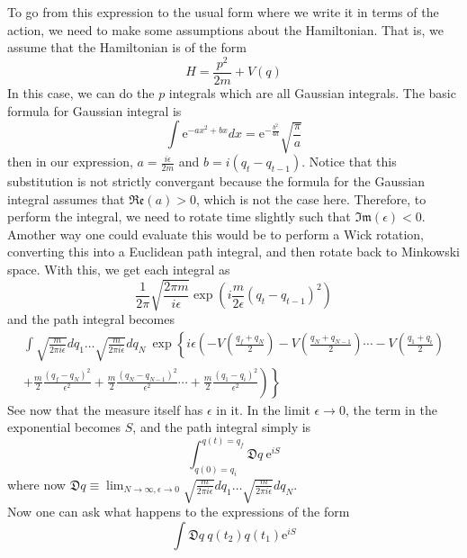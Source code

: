 \documentclass[11pt]{article}
\newcommand{\e}{\mathrm{e}}
\newcommand{\D}{\mathfrak{D}}
\numberwithin{equation}{section}
\begin{document}
To go from this expression to the usual form where we write it in terms of the action, we need to make some assumptions about the Hamiltonian. That is, we assume that the Hamiltonian is of the form 
\begin{equation*}
    H = \frac{p^2}{2m} + V(q)
\end{equation*}
In this case, we can do the \(p\) integrals which are all Gaussian integrals. The basic formula for Gaussian integral is 
\begin{equation*}
    \int \e^{-ax^2 + bx}dx = \e^{-\frac{b^2}{4a}}\sqrt{\frac{\pi}{a}}
\end{equation*}
then in our expression, \(a =\displaystyle \frac{i\epsilon}{2m}\) and \(b = i(q_t - q_{t-1})\). Notice that this substitution is not strictly convergant because the formula for the Gaussian integral assumes that \(\mathfrak{Re}(a) >0 \), which is not the case here. Therefore, to perform the integral, we need to rotate time slightly such that \(\mathfrak{Im}(\epsilon)<0 \). Amother way one could evaluate this would be to perform a Wick rotation, converting this into a Euclidean path integral, and then rotate back to Minkowski space. With this, we get each integral as 
\begin{equation*}
    \frac{1}{2\pi} \sqrt{\frac{2\pi m}{i\epsilon}}\exp\left( i\frac{m}{2\epsilon} (q_t - q_{t-1})^2 \right)
\end{equation*}
and the path integral becomes 
\begin{align*}
    \int \sqrt{\frac{m}{2\pi i\epsilon}} dq_1 \ldots\sqrt{\frac{m}{2\pi i\epsilon}} dq_N ~\exp\left\{i\epsilon \left( -V\left(\frac{q_f + q_N}{2}\right) - V\left(\frac{q_N + q_{N-1}}{2}\right) \cdots -V\left(\frac{q_1 + q_{i}}{2}\right) \right.\right. \\
    \left.\left.+ \frac{m}{2}\frac{(q_f - q_N)^2}{\epsilon^2} + \frac{m}{2} \frac{(q_N - q_{N-1})^2}{\epsilon^2}\cdots  +  \frac{m}{2} \frac{(q_1 - q_{i})^2}{\epsilon^2} \right) \right\}
\end{align*}
See now that the measure itself has \(\epsilon\) in it.  In the limit \(\epsilon \to 0\), the term in the exponential becomes \(S\), and the path integral simply is 
\begin{equation*}
    \int_{q(0) = q_i}^{q(t) = q_f} \mathfrak{D}q ~\e^{iS}
\end{equation*}
where now \(\displaystyle \mathfrak{D}q \equiv \lim_{N\to\infty, \epsilon\to 0} \sqrt{\frac{m}{2\pi i\epsilon}} dq_1 \ldots\sqrt{\frac{m}{2\pi i\epsilon}} dq_N \).\\

Now one can ask what happens to the expressions of the form 
\begin{equation*}
    \int \D q ~q(t_2)q(t_1) \e^{iS}
\end{equation*}
\end{document}
